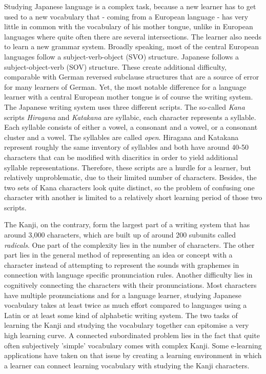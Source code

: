 Studying Japanese language is a complex task, because a new learner has to get 
used to a new vocabulary that - coming from a European language - has very 
little in common with the vocabulary of his mother tongue, unlike in European 
languages where quite often there are several intersections. The learner also 
needs to learn a new grammar system. Broadly speaking, most of the central 
European languages follow a subject-verb-object (SVO) structure. 
Japanese follows a subject-object-verb (SOV) structure. These create additional 
difficulty, comparable with German reversed subclause structures that 
are a source of error for many learners of German. 
Yet, the most notable difference for a language learner with a central European 
mother tongue is of course the writing system. The Japanese writing system uses 
three different scripts. The so-called \emph{Kana} scripts \emph{Hiragana} and 
\emph{Katakana} are syllabic, each character represents a syllable. Each syllable
consists of either a vowel, a consonant and a vowel, or a consonant cluster and 
a vowel. The syllables are called \emph{open}. Hiragana and Katakana represent 
roughly the same inventory of syllables and both have around 40-50 characters 
that can be modified with diacritics in order to yield additional syllable 
representations. Therefore, these scripts are a hurdle for a learner, but 
relatively unproblematic, due to their limited number of characters. 
Besides, the two sets of Kana characters look quite distinct, 
so the problem of confusing one character with another is limited to a relatively
short learning period of those two scripts.

The Kanji, on the contrary, form the largest part of a writing system that has 
around 3,000 characters, which are built up of around 200 subunits called 
\emph{radicals}. 
One part of the complexity lies in the number of characters. 
The other part lies in the general method of representing an 
idea or concept with a character instead of attempting to represent the sounds
with graphemes in connection with language specific pronunciation rules. 
Another difficulty lies in cognitively connecting the characters with their 
pronunciations. Most characters have multiple pronunciations and for a language 
learner, studying Japanese vocabulary takes at least twice as much effort 
compared to languages using a Latin or at least some kind of alphabetic writing 
system. The two tasks of learning the Kanji and studying the vocabulary 
together can epitomise a very high learning curve. A connected subordinated 
problem lies in the fact that quite often subjectively 'simple' vocabulary comes 
with complex Kanji. Some e-learning applications have taken on that issue by 
creating a learning environment in which a learner can connect learning 
vocabulary with studying the Kanji characters.

